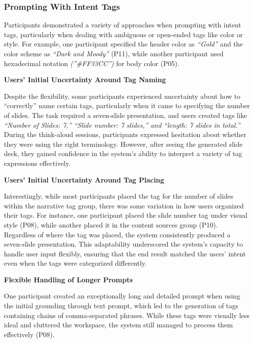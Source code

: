 \subsubsection{\textbf{Prompting With Intent Tags}}

Participants demonstrated a variety of approaches when prompting with intent tags, particularly when dealing with ambiguous or open-ended tags like color or style. For example, one participant specified the header color as \textit{“Gold”} and the color scheme as \textit{“Dark and Moody”} (P11), while another participant used hexadecimal notation \textit{(”\#FF33CC”)} for body color (P05). 


\textbf{Users' Initial Uncertainty Around Tag Naming}

Despite the flexibility, some participants experienced uncertainty about how to “correctly” name certain tags, particularly when it came to specifying the number of slides. The task required a seven-slide presentation, and users created tags like \textit{“Number of Slides: 7,” “Slide number: 7 slides,” and “length: 7 slides in total.”} During the think-aloud sessions, participants expressed hesitation about whether they were using the right terminology. However, after seeing the generated slide deck, they gained confidence in the system’s ability to interpret a variety of tag expressions effectively.

\textbf{Users' Initial Uncertainty Around Tag Placing}

Interestingly, while most participants placed the tag for the number of slides within the narrative tag group, there was some variation in how users organized their tags. For instance, one participant placed the slide number tag under visual style (P08), while another placed it in the content sources group (P10). Regardless of where the tag was placed, the system consistently produced a seven-slide presentation. This adaptability underscored the system’s capacity to handle user input flexibly, ensuring that the end result matched the users’ intent even when the tags were categorized differently.

\textbf{Flexible Handling of Longer Prompts}

One participant created an exceptionally long and detailed prompt when using the initial grounding through text prompt, which led to the generation of tags containing chains of comma-separated phrases. While these tags were visually less ideal and cluttered the workspace, the system still managed to process them effectively (P08).

